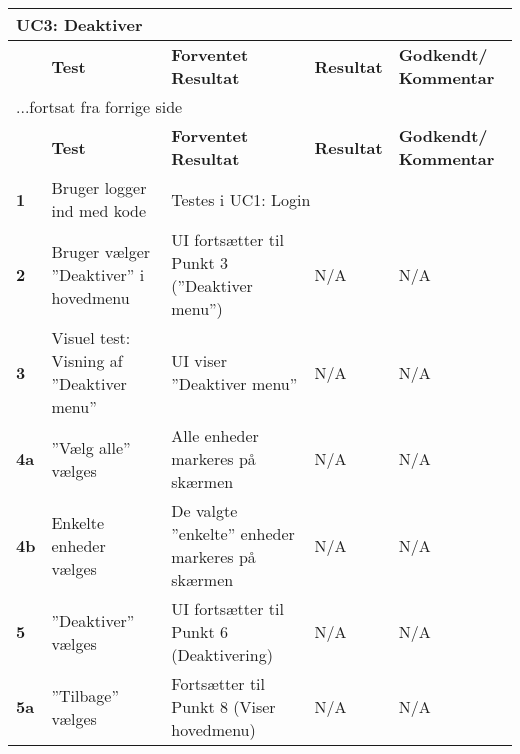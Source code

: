 
\begin{center}
\begin{longtable}{|p{}|p{}|p{}|p{}|p{}|} %
\hline
\multicolumn{5}{|l|}{\textbf{UC3: Deaktiver}} \\ \hline
\multicolumn{1}{|c|}{} &
\textbf{Test} &
\textbf{Forventet \newline Resultat} &
\textbf{Resultat} &
\textbf{Godkendt/ \newline Kommentar} \\ \hline 
\endfirsthead

\multicolumn{5}{l}{...fortsat fra forrige side} \\ \hline 
\multicolumn{1}{|c|}{} &
\textbf{Test} &
\textbf{Forventet \newline Resultat} &
\textbf{Resultat} &
\textbf{Godkendt/ \newline Kommentar} \\ \hline 
\endhead


\textbf{1}			&Bruger logger ind med kode	
					&\multicolumn{3}{l|}{Testes i UC1: Login} \\\hline
		
\textbf{2}			&Bruger vælger ''Deaktiver'' i hovedmenu																
					&UI fortsætter til Punkt 3 (''Deaktiver menu'')
					&N/A 
					&N/A \\\hline
					
\textbf{3}			&Visuel test: Visning af ''Deaktiver menu''																
					&UI viser ''Deaktiver menu''
					&N/A 
					&N/A \\\hline
		
\textbf{4a}			&''Vælg alle'' vælges		
					&Alle enheder markeres på skærmen		 	
					&N/A 
					&N/A \\\hline

\textbf{4b}			&Enkelte enheder vælges
					&De valgte ''enkelte'' enheder markeres på skærmen
					&N/A 
					&N/A \\\hline

\textbf{5}			&''Deaktiver'' vælges			
					&UI fortsætter til Punkt 6 (Deaktivering)
					&N/A 
					&N/A \\\hline
					
\textbf{5a}			&''Tilbage'' vælges			
					&Fortsætter til Punkt 8 (Viser hovedmenu)
					&N/A 
					&N/A \\\hline


\end{longtable}
\end{center}
